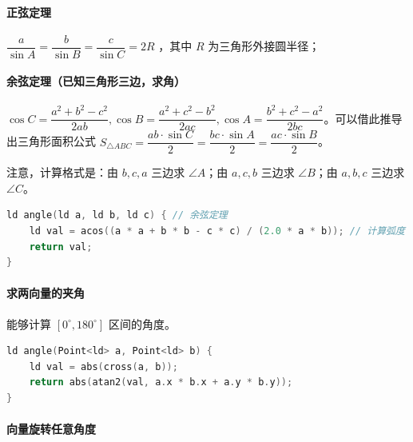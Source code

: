 \hypertarget{ux6b63ux5f26ux5b9aux7406}{%
\paragraph{正弦定理}\label{ux6b63ux5f26ux5b9aux7406}}

\(\dfrac{a}{\sin A}=\dfrac{b}{\sin B}=\dfrac{c}{\sin C}=2R\) ，其中 \(R\) 为三角形外接圆半径；

\hypertarget{ux4f59ux5f26ux5b9aux7406ux5df2ux77e5ux4e09ux89d2ux5f62ux4e09ux8fb9ux6c42ux89d2}{%
\paragraph{余弦定理（已知三角形三边，求角）}\label{ux4f59ux5f26ux5b9aux7406ux5df2ux77e5ux4e09ux89d2ux5f62ux4e09ux8fb9ux6c42ux89d2}}

\(\cos C=\dfrac{a^2+b^2-c^2}{2ab},\cos B=\dfrac{a^2+c^2-b^2}{2ac},\cos A=\dfrac{b^2+c^2-a^2}{2bc}\)。可以借此推导出三角形面积公式 \(S_{\triangle ABC}=\dfrac{ab\cdot\sin C}{2}=\dfrac{bc\cdot\sin A}{2}=\dfrac{ac\cdot\sin B}{2}\)。

注意，计算格式是：由 \(b,c,a\) 三边求 \(\angle A\)；由 \(a, c, b\) 三边求 \(\angle B\)；由 \(a, b, c\) 三边求 \(\angle C\)。

\begin{lstlisting}[language={C++}]
ld angle(ld a, ld b, ld c) { // 余弦定理
    ld val = acos((a * a + b * b - c * c) / (2.0 * a * b)); // 计算弧度
    return val;
}
\end{lstlisting}

\hypertarget{ux6c42ux4e24ux5411ux91cfux7684ux5939ux89d2}{%
\paragraph{求两向量的夹角}\label{ux6c42ux4e24ux5411ux91cfux7684ux5939ux89d2}}

能够计算 \([0^{\circ},180^{\circ}]\) 区间的角度。

\begin{lstlisting}[language={C++}]
ld angle(Point<ld> a, Point<ld> b) {
    ld val = abs(cross(a, b));
    return abs(atan2(val, a.x * b.x + a.y * b.y));
}
\end{lstlisting}

\hypertarget{ux5411ux91cfux65cbux8f6cux4efbux610fux89d2ux5ea6}{%
\paragraph{向量旋转任意角度}\label{ux5411ux91cfux65cbux8f6cux4efbux610fux89d2ux5ea6}}

